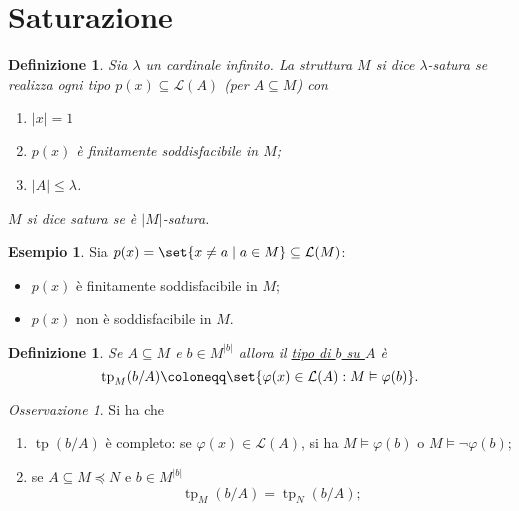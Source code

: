 \documentclass[10pt]{article}
\newcommand{\card}[1]{\left\vert #1 \right\vert}
\newcommand{\1}{\mathds{1}}
\theoremstyle{definition}%
\newtheorem{esempio}[thm]{Esempio}
\theoremstyle{plain}
\newtheorem{definizione}[thm]{Definizione}
\theoremstyle{remark}
\newtheorem*{oss}{Osservazione}
\begin{document}
\section{Saturazione}
\label{sec:org39b7c7c}

\begin{definizione}
Sia \(\lambda\) un cardinale infinito. La struttura \(M\) si dice \(\lambda\)-satura se realizza ogni tipo \(p(x) \subseteq \mathcal{L}(A)\) (per \(A \subseteq M\)) con
\begin{enumerate}
\item \(\card{x}=1\)
\item \(p(x)\) è finitamente soddisfacibile in \(M\);
\item \(\card{A}\le\lambda\).
\end{enumerate}

\(M\) si dice satura se è \(\card{M}\)-satura.
\end{definizione}

\begin{esempio}
Sia \(p(x) = \set{x\neq a\mid  a \in M} \subseteq \mathcal{L}(M)\):
\begin{itemize}
\item \(p(x)\) è finitamente soddisfacibile in \(M\);
\item \(p(x)\) non è soddisfacibile in \(M\).
\end{itemize}
\end{esempio}

\begin{definizione}
Se \(A \subseteq M\) e \(b \in M^{|b|}\) allora il \uline{tipo di \(b\) su \(A\)} è
\begin{equation*}
\operatorname{tp}_{M}(b/A) \coloneqq\set{\varphi(x) \in \mathcal{L}(A): M\vDash \varphi(b)}.
\end{equation*}
\end{definizione}

\begin{oss}
Si ha che
\begin{enumerate}
\item \(\operatorname{tp}(b/A)\) è completo: se \(\varphi(x) \in \mathcal{L}(A)\), si ha \(M\vDash\varphi(b)\) o \(M\vDash \lnot\varphi(b)\);
\item se \(A \subseteq M\preceq N\) e \(b \in M^{|b|}\)
\begin{equation*}
 \operatorname{tp}_{M}(b/A) = \operatorname{tp}_{N}(b/A);
\end{equation*}
\end{enumerate}
\end{oss}
\end{document}
